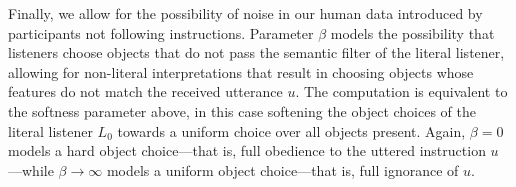 \documentclass[10pt,a4paper]{article}
\begin{document}

Finally, we allow for the possibility of noise in our human data introduced by participants not following instructions.
Parameter $\beta$ models the possibility that listeners choose objects that do not pass the semantic filter of the literal listener, allowing for non-literal interpretations that result in choosing objects whose features do not match the received utterance $u$. 
The computation is equivalent to the softness parameter above, in this case softening the object choices of the literal listener $L_0$ towards a uniform choice over all objects present. 
Again, $\beta=0$ models a hard object choice---that is, full obedience to the uttered instruction $u$---while $\beta \rightarrow \infty$ models a uniform object choice---that is, full ignorance of $u$.




\setlength{\bibleftmargin}{.125in}
\setlength{\bibindent}{-\bibleftmargin}


\end{document}
